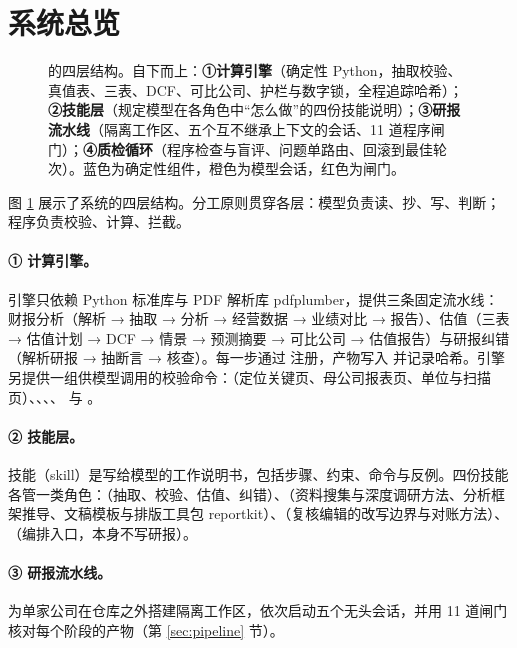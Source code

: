 \section{系统总览}
\label{sec:arch}

\begin{figure}[t]
  \centering
  \caption{\sysname{} 的四层结构。自下而上：\textbf{①计算引擎}（确定性 Python，抽取校验、真值表、三表、DCF、可比公司、护栏与数字锁，全程追踪哈希）；\textbf{②技能层}（规定模型在各角色中“怎么做”的四份技能说明）；\textbf{③研报流水线}（隔离工作区、五个互不继承上下文的会话、11 道程序闸门）；\textbf{④质检循环}（程序检查与盲评、问题单路由、回滚到最佳轮次）。蓝色为确定性组件，橙色为模型会话，红色为闸门。}
  \label{fig:arch}
\end{figure}

图 \ref{fig:arch} 展示了系统的四层结构。分工原则贯穿各层：模型负责读、抄、写、判断；程序负责校验、计算、拦截。

\paragraph{① 计算引擎。}引擎只依赖 Python 标准库与 PDF 解析库 pdfplumber，提供三条固定流水线：财报分析（解析 → 抽取 → 分析 → 经营数据 → 业绩对比 → 报告）、估值（三表 → 估值计划 → DCF → 情景 → 预测摘要 → 可比公司 → 估值报告）与研报纠错（解析研报 → 抽断言 → 核查）。每一步通过  注册，产物写入  并记录哈希。引擎另提供一组供模型调用的校验命令：（定位关键页、母公司报表页、单位与扫描页）、、、、 与 。

\paragraph{② 技能层。}技能（skill）是写给模型的工作说明书，包括步骤、约束、命令与反例。四份技能各管一类角色：（抽取、校验、估值、纠错）、（资料搜集与深度调研方法、分析框架推导、文稿模板与排版工具包 reportkit）、（复核编辑的改写边界与对账方法）、（编排入口，本身不写研报）。

\paragraph{③ 研报流水线。} 为单家公司在仓库之外搭建隔离工作区，依次启动五个无头会话，并用 11 道闸门核对每个阶段的产物（第 \ref{sec:pipeline} 节）。

